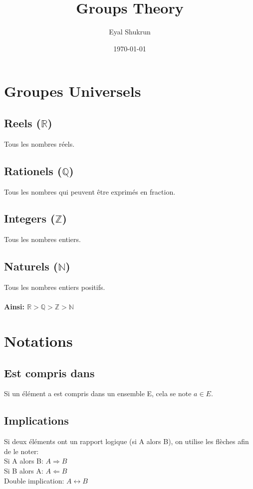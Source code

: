 \documentclass[12pt]{article}
\title{Groups Theory}
\date{\today}
\author{Eyal Shukrun}
\begin{document}
\maketitle

\section{Groupes Universels}
  
\subsection{Reels ($\mathbb{R}$)}
Tous les nombres réels.
\subsection{Rationels ($\mathbb{Q}$)}
Tous les nombres qui peuvent être exprimés en fraction.
\subsection{Integers ($\mathbb{Z}$)}
Tous les nombres entiers.
\subsection{Naturels ($\mathbb{N}$)}
Tous les nombres entiers positifs.
\\
\\
\textbf{Ainsi: $\mathbb{R} > \mathbb{Q} > \mathbb{Z} > \mathbb{N}$}
\\
\section{Notations}
\subsection{Est compris dans}
Si un élément a est compris dans un ensemble E, cela se note $a \in E$.
 
\subsection{Implications}
Si deux éléments ont un rapport logique (si A alors B), on utilise les flèches afin de le noter:\\
Si A alors B: $A \Rightarrow B$\\
Si B alors A: $A \Leftarrow B$\\
Double implication: $A \leftrightarrow B$\\
  
\end{document}

